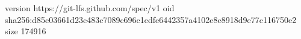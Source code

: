 version https://git-lfs.github.com/spec/v1
oid sha256:d85c03661d23c483c7089c696c1edfe6442357a4102e8e8918d9e77c116750e2
size 174916

